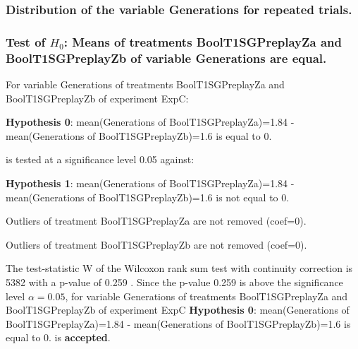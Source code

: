 \documentclass[18pt,c]{beamer}
\begin{document}
 \begin{frame}
 \fontsize{8pt}{9pt}\selectfont
 \frametitle{ Distribution of the variable Generations for repeated trials. }

 \label{ExpCStatsTable004.tex}  
 \end{frame}

\begin{frame}[t]
 \frametitle{Test of $H_{0}$: Means of treatments BoolT1SGPreplayZa and BoolT1SGPreplayZb of variable Generations are equal. }
 \scriptsize
 For variable Generations of treatments BoolT1SGPreplayZa and BoolT1SGPreplayZb of experiment ExpC:

\vspace{1mm}
{\bf Hypothesis 0}: mean(Generations of BoolT1SGPreplayZa)=1.84 - mean(Generations of BoolT1SGPreplayZb)=1.6 is equal to 0.


 \begin{center} is tested at a significance level 0.05 against: \end{center}

{\bf Hypothesis 1}: mean(Generations of BoolT1SGPreplayZa)=1.84 - mean(Generations of BoolT1SGPreplayZb)=1.6 is not equal to 0.
\vspace{1mm}
\vspace{1mm}

 Outliers of treatment BoolT1SGPreplayZa  are not removed (coef=0).

 Outliers of treatment BoolT1SGPreplayZb  are not removed (coef=0).
\vspace{1mm}
 
 The test-statistic W of the Wilcoxon rank sum test with continuity correction is 5382 with a p-value of 0.259 .
 Since the p-value 0.259 is above the significance level $\alpha= 0.05 $,
 for variable Generations of treatments BoolT1SGPreplayZa and BoolT1SGPreplayZb of experiment ExpC 
 {\bf Hypothesis 0}: mean(Generations of BoolT1SGPreplayZa)=1.84 - mean(Generations of BoolT1SGPreplayZb)=1.6 is equal to 0.
is {\bf accepted}.

 \end{frame}
\end{document}
